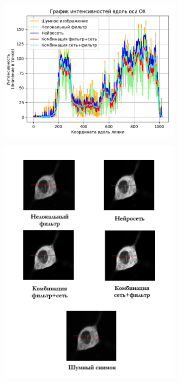 \begin{figure}[H]
	\begin{subfigure}[t]{0.6\textwidth\relax}
		\centering
		\includegraphics[width=.95\linewidth,valign=t]{my_folder/images/denoising/intensity_test2.png}
	\end{subfigure}
	\hfill %
	\begin{subfigure}[t]{0.3\textwidth\relax}
		\centering
		\includegraphics[width=.95\linewidth,valign=t]{my_folder/images/denoising/intensity_test2_images.png}

\end{subfigure}
\end{figure}

